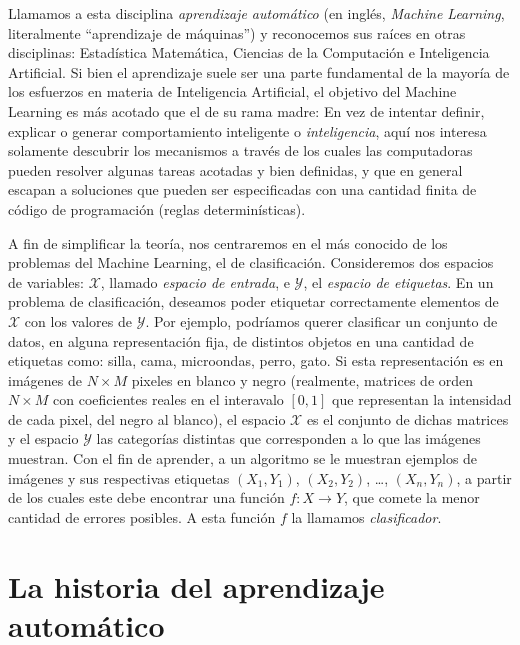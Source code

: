 \documentclass{report}
\begin{document}
Llamamos a esta disciplina \textit{aprendizaje automático} (en inglés, \textit{Machine Learning}, literalmente ``aprendizaje de máquinas'') y reconocemos
sus raíces en otras disciplinas: Estadística Matemática, Ciencias de la Computación e Inteligencia Artificial. Si bien el aprendizaje suele ser una
parte fundamental de la mayoría de los esfuerzos en materia de Inteligencia Artificial, el objetivo del Machine Learning es más acotado que el de su 
rama madre: En vez de intentar definir, explicar o generar comportamiento inteligente o \textit{inteligencia}, aquí nos interesa solamente descubrir los mecanismos
a través de los cuales las computadoras pueden resolver algunas tareas acotadas y bien definidas, y que en general escapan a soluciones que pueden
ser especificadas con una cantidad finita de código de programación (reglas determinísticas).\newline

A fin de simplificar la teoría, nos centraremos  en el más conocido de los problemas del Machine Learning, el de clasificación. Consideremos dos espacios
de variables: \(\mathcal{X}\), llamado \textit{espacio de entrada}, e \(\mathcal{Y}\), el  \textit{espacio de etiquetas}. En un problema de clasificación, deseamos poder etiquetar 
correctamente elementos de \(\mathcal{X}\) con los valores de \(\mathcal{Y}\). Por ejemplo, podríamos querer clasificar un conjunto de datos, en alguna representación fija, de distintos 
objetos en una cantidad de etiquetas como: silla, cama, microondas, perro, gato. Si esta representación es en imágenes de \(N\times M\) pixeles en blanco y negro (realmente, 
matrices de orden \(N\times M\) con coeficientes reales en el interavalo \([0,1]\) que representan la intensidad de cada pixel, del negro al blanco), el espacio \(\mathcal{X}\) es 
el conjunto de dichas matrices y el espacio \(\mathcal{Y}\) las categorías distintas que corresponden a lo que las imágenes muestran. Con el fin de aprender, a un algoritmo se le 
muestran ejemplos de imágenes y sus respectivas etiquetas \((X_1,Y_1)\), \((X_2,Y_2)\), \dots, \((X_n,Y_n)\), a partir de los cuales este debe encontrar una función
\(f: X\rightarrow Y\), que comete la menor cantidad de errores posibles. A esta función \(f\) la llamamos \textit{clasificador}.\newline

\section{La historia del aprendizaje automático}
\end{document}
